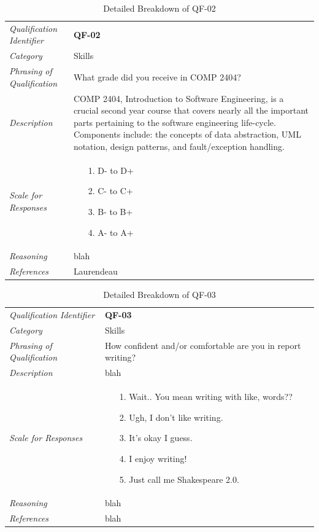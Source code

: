 \documentclass[12pt,letterpaper]{article}
\begin{document}
\begin{table}[H]
	\caption{Detailed Breakdown of QF-02}
	\begin{tabu} to 
		\toprule
		Qualification Identifier & {\bf QF-02}\\
		Category & Skills \\
		Phrasing of Qualification & What grade did you receive in COMP 2404? \\
		Description & COMP 2404, Introduction to Software Engineering, is a crucial second year course that covers nearly all the important parts pertaining to the software engineering life-cycle. Components include: the concepts of data abstraction, UML notation, design patterns, and fault/exception handling.\\
		Scale for Responses &
		\begin{minipage}[t]{\linewidth}
			\begin{enumerate}
				\item[1.] D- to D+
				\item[2.] C- to C+
				\item[3.] B- to B+
				\item[4.] A- to A+
			\end{enumerate}
		\end{minipage}\\
		Reasoning & blah\\
		References & Laurendeau\cite{claurend2}\\
		\toprule
	\end{tabu}
\end{table}

\begin{table}[H]
	\caption{Detailed Breakdown of QF-03}
	\begin{tabu} to 
		\toprule
		Qualification Identifier & {\bf QF-03}\\
		Category & Skills \\
		Phrasing of Qualification & How confident and/or comfortable are you in report writing? \\
		Description & blah\\
		Scale for Responses &
		\begin{minipage}[t]{\linewidth}
			\begin{enumerate}
				\item[1.] Wait.. You mean writing with like, words?? 
				\item[2.] Ugh, I don't like writing.
				\item[3.] It's okay I guess.
				\item[4.] I enjoy writing!
				\item[5.] Just call me Shakespeare 2.0.
			\end{enumerate}
		\end{minipage}\\
		Reasoning & blah\\
		References & blah\\
		\toprule
	\end{tabu}
\end{table}
\end{document}
